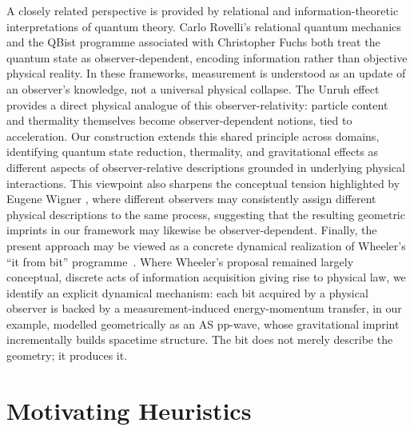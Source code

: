 \documentclass[12pt,a4paper]{article}
\begin{document}
A closely related perspective is provided by relational and information-theoretic interpretations of quantum theory. Carlo Rovelli’s relational quantum mechanics \cite{rovelli1996relational} and the QBist programme associated with Christopher Fuchs \cite{fuchs2014introduction} both treat the quantum state as observer-dependent, encoding information rather than objective physical reality. In these frameworks, measurement is understood as an update of an observer’s knowledge, not a universal physical collapse. The Unruh effect \cite{unruh1976notes} provides a direct physical analogue of this observer-relativity: particle content and thermality themselves become observer-dependent notions, tied to acceleration. Our construction extends this shared principle across domains, identifying quantum state reduction, thermality, and gravitational effects as different aspects of observer-relative descriptions grounded in underlying physical interactions. This viewpoint also sharpens the conceptual tension highlighted by Eugene Wigner \cite{wigner1995remarks}, where different observers may consistently assign different physical descriptions to the same process, suggesting that the resulting geometric imprints in our framework may likewise be observer-dependent. Finally, the present approach may be viewed as a concrete dynamical realization of Wheeler's ``it from bit'' programme~\cite{wheeler2018information}. Where Wheeler's proposal remained largely conceptual, discrete acts of information acquisition giving rise to physical law, we identify an explicit dynamical mechanism: each bit acquired by a physical observer is backed by a measurement-induced energy-momentum transfer, in our example, modelled geometrically as an AS pp-wave, whose gravitational imprint incrementally builds spacetime structure. The bit does not merely describe the geometry; it produces it.


\section{Motivating Heuristics}
\label{sec:heuristics}
\end{document}
